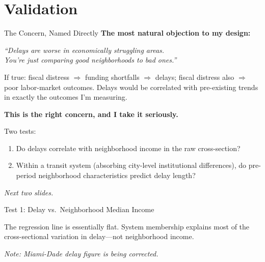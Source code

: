 \documentclass{beamer}
\begin{document}
\section{Validation}

\begin{frame}{The Concern, Named Directly}
\small
\textbf{The most natural objection to my design:}

\begin{center}
\textit{``Delays are worse in economically struggling areas.\\
You're just comparing good neighborhoods to bad ones.''}
\end{center}

\medskip
If true: fiscal distress $\Rightarrow$ funding shortfalls $\Rightarrow$ delays;
fiscal distress also $\Rightarrow$ poor labor-market outcomes. Delays would be
correlated with pre-existing trends in exactly the outcomes I'm measuring.

\medskip
\textbf{This is the right concern, and I take it seriously.}

\medskip
Two tests:
\begin{enumerate}
    \item Do delays correlate with neighborhood income in the raw cross-section?
    \item Within a transit system (absorbing city-level institutional differences),
          do pre-period neighborhood characteristics predict delay length?
\end{enumerate}

\medskip
\textit{Next two slides.}
\end{frame}

\begin{frame}{Test 1: Delay vs.\ Neighborhood Median Income}
\begin{center}
\end{center}
\small
The regression line is essentially flat. System membership explains most of the
cross-sectional variation in delay---not neighborhood income.

\medskip
\textit{Note: Miami-Dade delay figure is being corrected.}
\end{frame}
\end{document}
